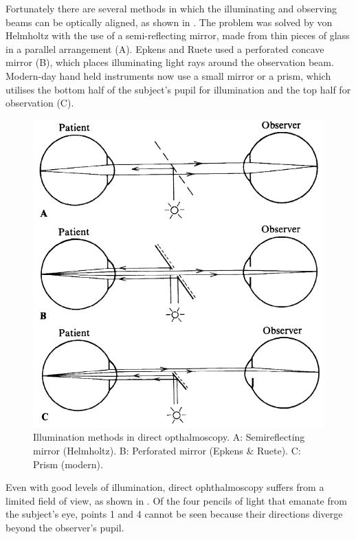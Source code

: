 Fortunately there are several methods in which the illuminating and
observing beams can be optically aligned, as shown in .
 The problem was solved by von Helmholtz with the use of a semi-reflecting
mirror, made from thin pieces of glass in a parallel arrangement (A). Epkens
and Ruete used a perforated concave mirror (B), which places illuminating
light rays around the observation beam.  Modern-day hand held instruments
now use a small mirror or a prism, which utilises the bottom half of the subject's
pupil for illumination and the top half for observation (C).

\begin{figure}[H]
\centering
  \includegraphics{figures/illumination_methods}
\caption{Illumination methods in direct opthalmoscopy. A: Semireflecting mirror (Helmholtz). B: Perforated mirror (Epkens \& Ruete). C: Prism (modern).\cite{colenbrander2013principles}}
\label{fig:illum_methods}
\end{figure}

Even with good levels of illumination, direct ophthalmoscopy suffers from
a limited field of view, as shown in .  Of the four pencils
of light that emanate from the subject's eye, points 1 and 4 cannot be seen
because their directions diverge beyond the observer's pupil.

